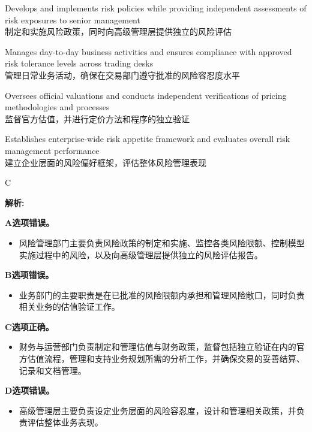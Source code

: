 \documentclass{article}
\newenvironment{explanation}
{\textbf{解析:}\par}
{\par}
\begin{document}
\begin{choices}
    \item Develops and implements risk policies while providing independent assessments of risk exposures to senior management\\
    制定和实施风险政策，同时向高级管理层提供独立的风险评估
    
    \item Manages day-to-day business activities and ensures compliance with approved risk tolerance levels across trading desks\\
    管理日常业务活动，确保在交易部门遵守批准的风险容忍度水平
    
    \item Oversees official valuations and conducts independent verifications of pricing methodologies and processes\\
    监督官方估值，并进行定价方法和程序的独立验证
    
    \item Establishes enterprise-wide risk appetite framework and evaluates overall risk management performance\\
    建立企业层面的风险偏好框架，评估整体风险管理表现
\end{choices}

\begin{correctanswer}
    C
\end{correctanswer}

\begin{explanation}
   
    \textbf{A选项错误。}
    \begin{itemize}
        \item 风险管理部门主要负责风险政策的制定和实施、监控各类风险限额、控制模型实施过程中的风险，以及向高级管理层提供独立的风险评估报告。
    \end{itemize}

    \textbf{B选项错误。}
    \begin{itemize}
        \item 业务部门的主要职责是在已批准的风险限额内承担和管理风险敞口，同时负责相关业务的估值验证工作。
    \end{itemize}

    \textbf{C选项正确。}
    \begin{itemize}
        \item 财务与运营部门负责制定和管理估值与财务政策，监督包括独立验证在内的官方估值流程，管理和支持业务规划所需的分析工作，并确保交易的妥善结算、记录和文档管理。
    \end{itemize}

    \textbf{D选项错误。}
    \begin{itemize}
        \item 高级管理层主要负责设定业务层面的风险容忍度，设计和管理相关政策，并负责评估整体业务表现。
    \end{itemize}
\end{explanation}
\end{document}
